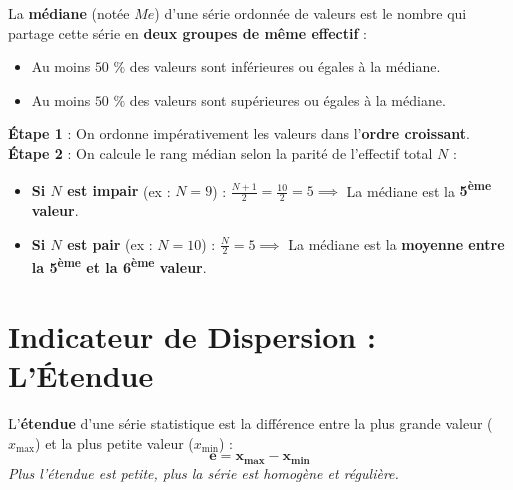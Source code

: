 \begin{cadredef}
La \textbf{médiane} (notée $Me$) d'une série ordonnée de valeurs est le nombre qui partage cette série en \textbf{deux groupes de même effectif} :
\begin{itemize}[leftmargin=1.5em, itemsep=2pt]
    \item Au moins $50\text{ \%}$ des valeurs sont inférieures ou égales à la médiane.
    \item Au moins $50\text{ \%}$ des valeurs sont supérieures ou égales à la médiane.
\end{itemize}
\end{cadredef}

\begin{cadremethode}
\textbf{Étape 1} : On ordonne impérativement les valeurs dans l'\textbf{ordre croissant}.\\
\textbf{Étape 2} : On calcule le rang médian selon la parité de l'effectif total $N$ :
\begin{itemize}[leftmargin=1.5em, itemsep=2pt]
    \item \textbf{Si $N$ est impair} (ex : $N = 9$) : $\frac{N+1}{2} = \frac{10}{2} = 5 \implies$ La médiane est la \textbf{5\textsuperscript{ème} valeur}.
    \item \textbf{Si $N$ est pair} (ex : $N = 10$) : $\frac{N}{2} = 5 \implies$ La médiane est la \textbf{moyenne entre la 5\textsuperscript{ème} et la 6\textsuperscript{ème} valeur}.
\end{itemize}
\end{cadremethode}

\section{Indicateur de Dispersion : L'Étendue}

\begin{cadredef}[Étendue ($e$)]
L'\textbf{étendue} d'une série statistique est la différence entre la plus grande valeur ($x_{\text{max}}$) et la plus petite valeur ($x_{\text{min}}$) :
\[ \mathbf{e = x_{\text{max}} - x_{\text{min}}} \]
\textit{Plus l'étendue est petite, plus la série est homogène et régulière.}
\end{cadredef}

